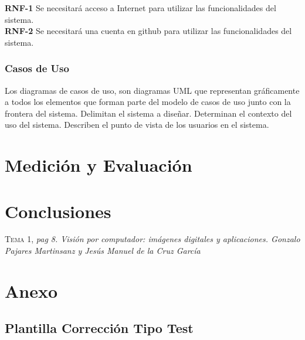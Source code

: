 \documentclass[a4paper,11pt]{book}
\begin{document}
\textbf{RNF-1} Se necesitará acceso a Internet para utilizar las funcionalidades del sistema.\\
\textbf{RNF-2} Se necesitará una cuenta en github para utilizar las funcionalidades del sistema.\\


\subsection{Casos de Uso}
Los diagramas de casos de uso, son diagramas UML que representan gráficamente a todos los elementos que forman parte del modelo de casos de uso junto con la frontera del sistema. Delimitan el sistema a diseñar. Determinan el contexto del uso del sistema. Describen el punto de vista de los usuarios  en el sistema.



\chapter{ Medición y Evaluación}

\chapter{Conclusiones}




\begin{thebibliography}{aaaa}



 \textsc{Tema 1},
\textit{ pag 8. Visión por computador: imágenes digitales y aplicaciones. Gonzalo Pajares Martinsanz y Jesús Manuel de la Cruz García}




\end{thebibliography}

\chapter{ Anexo}

\section{Plantilla Corrección Tipo Test }




%
%
%
%

%
%

\thispagestyle{empty}
\end{document}
